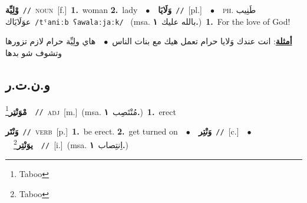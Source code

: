 \documentclass[10pt,a4paper,twoside]{article} %
\begin{document}
\begin{multicols}{2}
{\setlength\topsep{0pt}\textbf{\foreignlanguage{arabic}{وْلِيِّة}}\ {\color{gray}\texttt{//}\color{black}}\ \textsc{noun}\ [f.]\ \textbf{1.}~woman  \textbf{2.}~lady\ \ $\bullet$\ \ \setlength\topsep{0pt}\textbf{\foreignlanguage{arabic}{وَلَايَا}}\ {\color{gray}\texttt{//}\color{black}}\ [pl.]\ \ $\bullet$\ \ \textsc{ph.} \color{gray} \foreignlanguage{arabic}{طَنِيب عوَلَايَاك}\color{black}\ {\color{gray}\texttt{/{\sffamily tˤaniːb ʕawalaːjaːk}/}\color{black}}\ \color{gray} (msa. \foreignlanguage{arabic}{بالله عليك}~\foreignlanguage{arabic}{\textbf{١.}})\color{black}\ \textbf{1.}~For the love of God!\  \begin{flushright}\color{gray}\foreignlanguage{arabic}{\textbf{\underline{\foreignlanguage{arabic}{أمثلة}}}: انت عندك وَلايا حرام تعمل هيك مع بنات الناس\ $\bullet$\ \  هاي ولِيِّة حرام لازم تزورها وتشوف شو بدها}\end{flushright}\color{black}} \vspace{2mm}

\vspace{-3mm}
\subsection*{\color{blue}\foreignlanguage{arabic}{و.ن.ت.ر}\color{blue}{}} 

{\setlength\topsep{0pt}\textbf{\foreignlanguage{arabic}{مْوَنْتِر}}\footnote{Taboo}\ \ {\color{gray}\texttt{//}\color{black}}\ \textsc{adj}\ [m.]\ \color{gray}(msa. \foreignlanguage{arabic}{مُنْتَصِب}~\foreignlanguage{arabic}{\textbf{١.}})\color{black}\ \textbf{1.}~erect\ } \vspace{2mm}

{\setlength\topsep{0pt}\textbf{\foreignlanguage{arabic}{وَنْتَر}}\ {\color{gray}\texttt{//}\color{black}}\ \textsc{verb}\ [p.]\ \textbf{1.}~be erect.  \textbf{2.}~get turned on\ \ $\bullet$\ \ \setlength\topsep{0pt}\textbf{\foreignlanguage{arabic}{وَنْتِر}}\ {\color{gray}\texttt{//}\color{black}}\ [c.]\ \ $\bullet$\ \ \setlength\topsep{0pt}\textbf{\foreignlanguage{arabic}{يوَنْتِر}}\footnote{Taboo}\ \ {\color{gray}\texttt{//}\color{black}}\ [i.]\ \color{gray}(msa. \foreignlanguage{arabic}{اِنتِصاب}~\foreignlanguage{arabic}{\textbf{١.}})\color{black}\ } \vspace{2mm}


\end{multicols}
\end{document}
